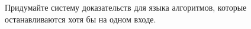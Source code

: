 Придумайте систему доказательств для языка алгоритмов, которые останавливаются хотя бы на одном входе.
